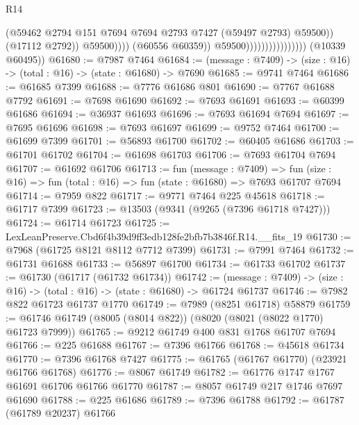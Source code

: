 \begin{lexlean}{R14}
\begin{coremodule}
                                                    (@59462
                                                      @2794
                                                      @151
                                                      @7694
                                                      @7694
                                                      @2793
                                                      @7427
                                                      (@59497 @2793)
                                                      @59500))
                                                  (@17112 @2792))
                                                @59500))))
                                        (@60556 @60359))
                                      @59500))))))))))))))))
      (@10339 @60495))
@61680 := @7987 @7464
@61684 := (message : @7409) -> (size : @16) -> (total : @16) -> (state : @61680) -> @7690
@61685 := @9741 @7464
@61686 := @61685 @7399
@61688 := @7776 @61686 @801
@61690 := @7767 @61688 @7792
@61691 := @7698 @61690
@61692 := @7693 @61691
@61693 := @60399 @61686
@61694 := @36937 @61693
@61696 := @7693 @61694 @7694
@61697 := @7695 @61696
@61698 := @7693 @61697
@61699 := @9752 @7464
@61700 := @61699 @7399
@61701 := @56893 @61700
@61702 := @60405 @61686
@61703 := @61701 @61702
@61704 := @61698 @61703
@61706 := @7693 @61704 @7694
@61707 := @61692 @61706
@61713 := fun (message : @7409) =>
  fun (size : @16) => fun (total : @16) => fun (state : @61680) => @7693 @61707 @7694
@61714 := @7959 @822
@61717 := @9771 @7464 @225 @45618
@61718 := @61717 @7399
@61723 := @13503 (@9341 (@9265 (@7396 @61718 @7427)))
@61724 := @61714 @61723
@61725 := LexLeanPreserve.Cbd6f4b39d9ff3edb128fe2bfb7b3846f.R14.__fits_19
@61730 := @7968 (@61725 @8121 @8112 @7712 @7399)
@61731 := @7991 @7464
@61732 := @61731 @61688
@61733 := @56897 @61700
@61734 := @61733 @61702
@61737 := @61730 (@61717 (@61732 @61734))
@61742 := (message : @7409) -> (size : @16) -> (total : @16) -> (state : @61680) -> @61724 @61737
@61746 := @7982 @822 @61723 @61737 @1770
@61749 := @7989 (@8251 @61718) @58879
@61759 := @61746 @61749 (@8005 (@8014 @822)) (@8020 (@8021 (@8022 @1770) @61723 @7999))
@61765 := @9212 @61749 @400 @831 @1768 @61707 @7694
@61766 := @225 @61688
@61767 := @7396 @61766
@61768 := @45618 @61734
@61770 := @7396 @61768 @7427
@61775 := @61765 (@61767 @61770) (@23921 @61766 @61768)
@61776 := @8067 @61749
@61782 := @61776 @1747 @1767 @61691 @61706 @61766 @61770
@61787 := @8057 @61749 @217 @1746 @7697 @61690
@61788 := @225 @61686
@61789 := @7396 @61788
@61792 := @61787 (@61789 @20237) @61766

\end{coremodule}
\end{lexlean}
